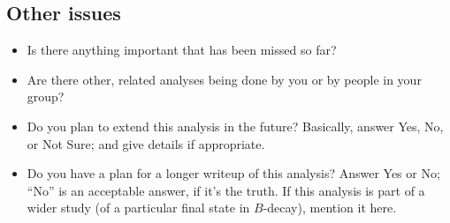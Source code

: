 \subsection*{Other issues}
\begin{itemize}

\item Is there anything important that has been missed so far?

\item Are there other, related analyses being done by you or by people in your group?

\item Do you plan to extend this analysis in the future?
 Basically, answer Yes, No, or Not Sure; and give details if appropriate.

\item Do you have a plan for a longer writeup of this analysis?
 Answer Yes or No; ``No'' is an acceptable answer, if it's the truth.
 If this analysis is part of a wider study (\eg of a particular
 final state in $B$-decay), mention it here.

\end{itemize}